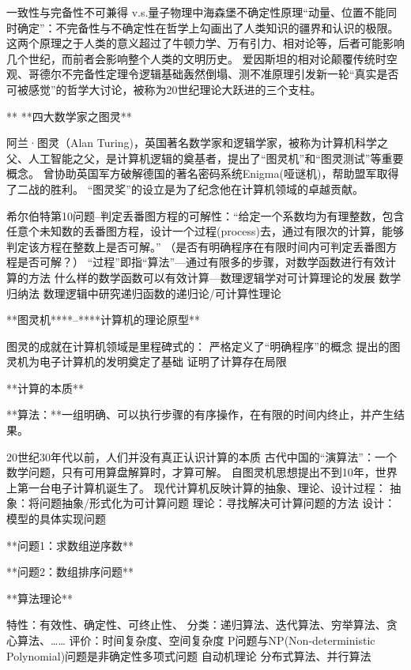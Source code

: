 一致性与完备性不可兼得 v.s.量子物理中海森堡不确定性原理“动量、位置不能同时确定”：不完备性与不确定性在哲学上勾画出了人类知识的疆界和认识的极限。这两个原理之于人类的意义超过了牛顿力学、万有引力、相对论等，后者可能影响几个世纪，而前者会影响整个人类的文明历史。
爱因斯坦的相对论颠覆传统时空观、哥德尔不完备性定理令逻辑基础轰然倒塌、测不准原理引发新一轮“真实是否可被感觉”的哲学大讨论，被称为20世纪理论大跃进的三个支柱。



** **四大数学家之图灵**

阿兰·图灵（Alan Turing)，英国著名数学家和逻辑学家，被称为计算机科学之父、人工智能之父，是计算机逻辑的奠基者，提出了“图灵机”和“图灵测试”等重要概念。
曾协助英国军方破解德国的著名密码系统Enigma(哑谜机)，帮助盟军取得了二战的胜利。
“图灵奖”的设立是为了纪念他在计算机领域的卓越贡献。



希尔伯特第10问题--判定丢番图方程的可解性：“给定一个系数均为有理整数，包含任意个未知数的丢番图方程，设计一个过程(process)去，通过有限次的计算，能够判定该方程在整数上是否可解。” 
（是否有明确程序在有限时间内可判定丢番图方程是否可解？）
 “过程”即指“算法”—通过有限多的步骤，对数学函数进行有效计算的方法
什么样的数学函数可以有效计算—数理逻辑学对可计算理论的发展
数学归纳法
数理逻辑中研究递归函数的递归论/可计算性理论



**图灵机****--****计算机的理论原型**



图灵的成就在计算机领域是里程碑式的：
 严格定义了“明确程序”的概念
 提出的图灵机为电子计算机的发明奠定了基础
 证明了计算存在局限



**计算的本质**

**算法：**一组明确、可以执行步骤的有序操作，在有限的时间内终止，并产生结果。

20世纪30年代以前，人们并没有真正认识计算的本质
古代中国的“演算法”：一个数学问题，只有可用算盘解算时，才算可解。
自图灵机思想提出不到10年，世界上第一台电子计算机诞生了。
现代计算机反映计算的抽象、理论、设计过程：
抽象：将问题抽象/形式化为可计算问题
理论：寻找解决可计算问题的方法
设计：模型的具体实现问题

**问题1：求数组逆序数**

**问题2：数组排序问题**



**算法理论**

特性：有效性、确定性、可终止性、
分类：递归算法、迭代算法、穷举算法、贪心算法、……
评价：时间复杂度、空间复杂度
P问题与NP(Non-deterministic Polynomial)问题是非确定性多项式问题
自动机理论
分布式算法、并行算法



